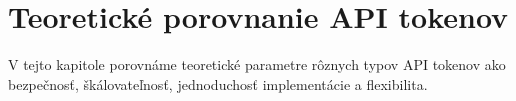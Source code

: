 \chapter{Teoretické porovnanie API tokenov}

\label{kap:teoreticke} %

V tejto kapitole porovnáme teoretické parametre rôznych typov API tokenov ako bezpečnosť, škálovateľnosť, jednoduchosť implementácie a flexibilita.
